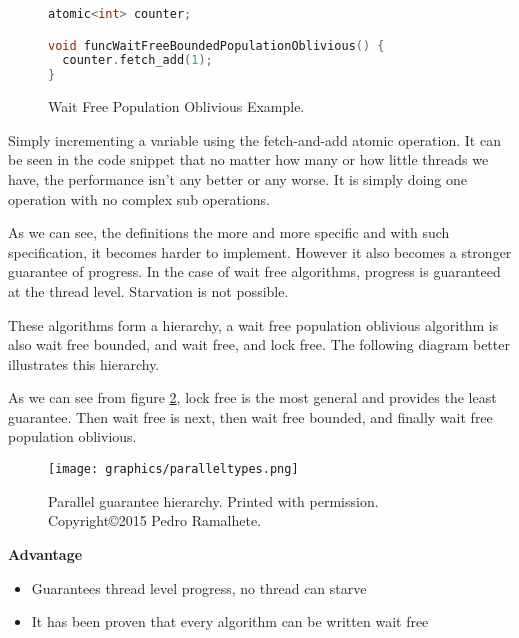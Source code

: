 \documentclass[letterpaper, 11pt]{article}
\begin{document}
\begin{figure}[H]
\begin{lstlisting}[language=C++]
atomic<int> counter;

void funcWaitFreeBoundedPopulationOblivious() {
  counter.fetch_add(1);
}
\end{lstlisting} 
\caption{Wait Free Population Oblivious Example.\cite{concurrencyfreaks}} \label{wfpo_ex}
\end{figure}

Simply incrementing a variable using the fetch-and-add atomic operation. It can be seen in the code snippet that no 
matter how many or how little threads we have, the performance isn't any better or any worse. 
It is simply doing one operation with no complex sub operations.
\par\vspace{\baselineskip}

As we can see, the definitions the more and more specific and with such specification, it becomes 
harder to implement. However it also becomes a stronger guarantee of progress. In the case of 
wait free algorithms, progress is guaranteed at the thread level. Starvation is not possible.
\par\vspace{\baselineskip}

These algorithms form a hierarchy, a wait free population oblivious algorithm is also wait 
free bounded, and wait free, and lock free. The following diagram better illustrates 
this hierarchy.
\par\vspace{\baselineskip}

As we can see from figure \ref{paralleltypes}, lock free is the most general and provides the least guarantee. Then 
wait free is next, then wait free bounded, and finally wait free population oblivious.
\par\vspace{\baselineskip}

\begin{figure}[H]
  \centering
  \texttt{[image: graphics/paralleltypes.png]}
  \caption{Parallel guarantee hierarchy. Printed with permission. \newline Copyright\copyright 2015 Pedro Ramalhete.\citep{concurrencyfreaks}}
  \label{paralleltypes}
\end{figure}

{\bfseries Advantage}
\par\vspace{\baselineskip}
\begin{itemize}
	\item Guarantees thread level progress, no thread can starve
	\item It has been proven that every algorithm can be written wait free
\end{itemize}
\end{document}

